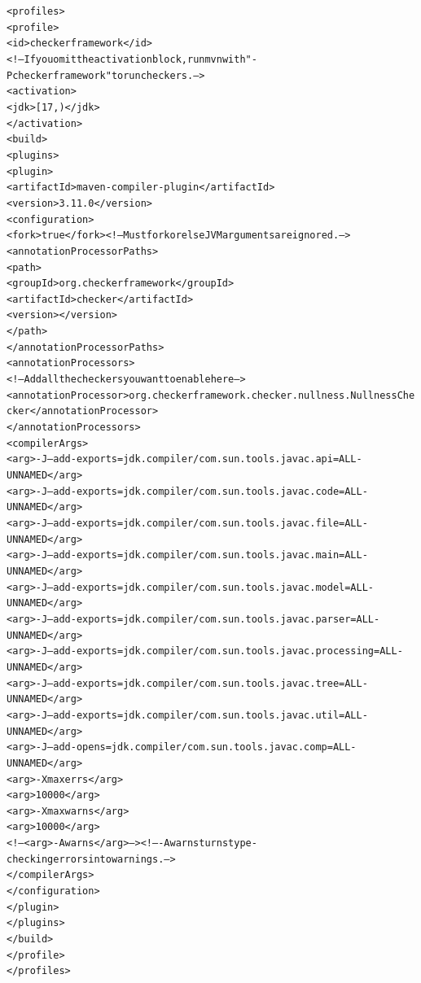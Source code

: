 \begin{enumerate}
\begin{mysmall}
\begin{alltt}
  <profiles>
    <profile>
      <id>checkerframework</id>
      <!-- If you omit the activation block, run mvn with "-P checkerframework" to run checkers. -->
      <activation>
        <jdk>[17,)</jdk>
      </activation>
      <build>
        <plugins>
          <plugin>
            <artifactId>maven-compiler-plugin</artifactId>
            <version>3.11.0</version>
            <configuration>
              <fork>true</fork> <!-- Must fork or else JVM arguments are ignored. -->
              <annotationProcessorPaths>
                <path>
                  <groupId>org.checkerframework</groupId>
                  <artifactId>checker</artifactId>
                  <version>\ReleaseVersion{}</version>
                </path>
              </annotationProcessorPaths>
              <annotationProcessors>
                <!-- Add all the checkers you want to enable here -->
                <annotationProcessor>org.checkerframework.checker.nullness.NullnessChecker</annotationProcessor>
              </annotationProcessors>
              <compilerArgs>
                <arg>-J--add-exports=jdk.compiler/com.sun.tools.javac.api=ALL-UNNAMED</arg>
                <arg>-J--add-exports=jdk.compiler/com.sun.tools.javac.code=ALL-UNNAMED</arg>
                <arg>-J--add-exports=jdk.compiler/com.sun.tools.javac.file=ALL-UNNAMED</arg>
                <arg>-J--add-exports=jdk.compiler/com.sun.tools.javac.main=ALL-UNNAMED</arg>
                <arg>-J--add-exports=jdk.compiler/com.sun.tools.javac.model=ALL-UNNAMED</arg>
                <arg>-J--add-exports=jdk.compiler/com.sun.tools.javac.parser=ALL-UNNAMED</arg>
                <arg>-J--add-exports=jdk.compiler/com.sun.tools.javac.processing=ALL-UNNAMED</arg>
                <arg>-J--add-exports=jdk.compiler/com.sun.tools.javac.tree=ALL-UNNAMED</arg>
                <arg>-J--add-exports=jdk.compiler/com.sun.tools.javac.util=ALL-UNNAMED</arg>
                <arg>-J--add-opens=jdk.compiler/com.sun.tools.javac.comp=ALL-UNNAMED</arg>
                <arg>-Xmaxerrs</arg>
                <arg>10000</arg>
                <arg>-Xmaxwarns</arg>
                <arg>10000</arg>
                <!-- <arg>-Awarns</arg> --> <!-- -Awarns turns type-checking errors into warnings. -->
              </compilerArgs>
            </configuration>
          </plugin>
        </plugins>
      </build>
    </profile>
  </profiles>
\end{alltt}
\end{mysmall}


\end{enumerate}
